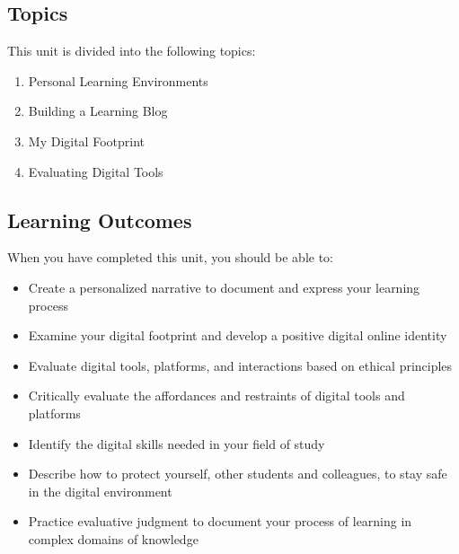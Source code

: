 \documentclass[
]{book}
\providecommand{\tightlist}{%
  \setlength{\itemsep}{0pt}\setlength{\parskip}{0pt}}
\theoremstyle{definition}
\theoremstyle{definition}
\theoremstyle{definition}
\theoremstyle{definition}
\theoremstyle{remark}
\begin{document}
\hypertarget{topics-3}{%
\subsection*{Topics}\label{topics-3}}

This unit is divided into the following topics:

\begin{enumerate}
\def\labelenumi{\arabic{enumi}.}
\tightlist
\item
  Personal Learning Environments\\
\item
  Building a Learning Blog\\
\item
  My Digital Footprint\\
\item
  Evaluating Digital Tools
\end{enumerate}

\hypertarget{learning-outcomes-3}{%
\subsection*{Learning Outcomes}\label{learning-outcomes-3}}

When you have completed this unit, you should be able to:

\begin{itemize}
\tightlist
\item
  Create a personalized narrative to document and express your learning process\\
\item
  Examine your digital footprint and develop a positive digital online identity\\
\item
  Evaluate digital tools, platforms, and interactions based on ethical principles\\
\item
  Critically evaluate the affordances and restraints of digital tools and platforms\\
\item
  Identify the digital skills needed in your field of study\\
\item
  Describe how to protect yourself, other students and colleagues, to stay safe in the digital environment\\
\item
  Practice evaluative judgment to document your process of learning in complex domains of knowledge
\end{itemize}
\end{document}
